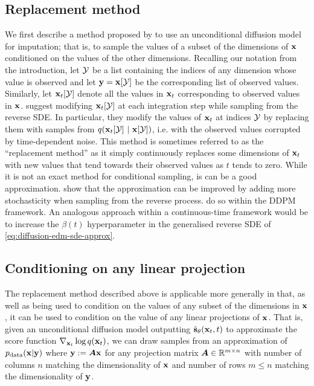 \subsection{Replacement method}
We first describe a method proposed by \citet{song2020score} to use an unconditional diffusion model for imputation; that is, to sample the values of a subset of the dimensions of ${\mathbf{x}}$ conditioned on the values of the other dimensions. Recalling our notation from the introduction, let ${\mathcal{Y}}$ be a list containing the indices of any dimension whose value is observed and let ${\mathbf{y}} = {\mathbf{x}}[{\mathcal{Y}}]$ be the corresponding list of observed values.
Similarly, let ${\mathbf{x}}_t[{\mathcal{Y}}]$ denote all the values in ${\mathbf{x}}_t$ corresponding to observed values in ${\mathbf{x}}$.
\citet{song2020score} suggest modifying ${\mathbf{x}}_t[{\mathcal{Y}}]$ at each integration step while sampling from the reverse SDE. In particular, they modify the values of ${\mathbf{x}}_t$ at indices ${\mathcal{Y}}$ by replacing them with samples from $q({\mathbf{x}}_t[{\mathcal{Y}}] ~|~ {\mathbf{x}}[{\mathcal{Y}}] )$, i.e. with the observed values corrupted by time-dependent noise. This method is sometimes referred to as the ``replacement method'' as it simply continuously replaces some dimensions of ${\mathbf{x}}_t$ with new values that tend towards their observed values as $t$ tends to zero. While it is not an exact method for conditional sampling, is can be a good approximation. \citet{lugmayr2022repaint} show that the approximation can be improved by adding more stochasticity when sampling from the reverse process. \citet{lugmayr2022repaint} do so within the DDPM framework. An analogous approach within a continuous-time framework would be to increase the $\beta(t)$ hyperparameter in the generalised reverse SDE of \cref{eq:diffusion-edm-sde-approx}. 



\subsection{Conditioning on any linear projection}
The replacement method described above is applicable more generally in that, as well as being used to condition on the values of any subset of the dimensions in ${\mathbf{x}}$, it can be used to condition on the value of any linear projections of ${\mathbf{x}}$. That is, given an unconditional diffusion model outputting $\hat{{\mathbf{s}}}_\theta({\mathbf{x}}_t, t)$ to approximate the score function $\nabla_{{\mathbf{x}}_t} \log q({\mathbf{x}}_t)$, we can draw samples from an approximation of $p_{\rm{data}}({\mathbf{x}}|{\mathbf{y}})$ where ${\mathbf{y}}:={\bm{A}}{\mathbf{x}}$ for any projection matrix ${\bm{A}} \in \mathbb{R}^{m \times n}$ with number of columns $n$ matching the dimensionality of ${\mathbf{x}}$ and number of rows $m \leq n$ matching the dimensionality of ${\mathbf{y}}$.

